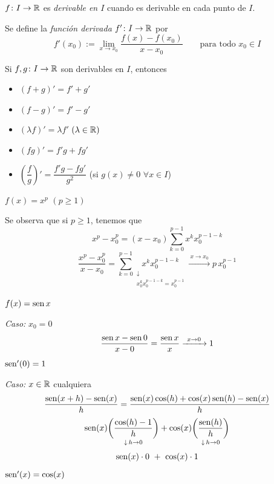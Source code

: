 \documentclass[11pt,a4paper]{article}
\newcommand{\abajo}[3][]{\underset{\substack{\downarrow\,#1\\ #3}}{#2}}
\begin{document}
\begin{definicion}
  $f\colon I\to\mathbb{R}$ es \emph{derivable en $I$} cuando es derivable en cada
  punto de $I$.

  Se define la \emph{función derivada} $f'\colon I\to\mathbb{R}$ por
  \[
    f'(x_0):=\lim_{x\to x_0}\frac{f(x)-f(x_0)}{x-x_0}
    \qquad\text{para todo } x_0\in I
  \]
\end{definicion}

\begin{proposicion}
  Si $f,g\colon I\to\mathbb{R}$ son derivables en $I$, entonces
  \begin{itemize}
    \item $(f+g)'=f'+g'$
    \item $(f-g)'=f'-g'$
    \item $(\lambda f)'=\lambda f'$ \quad $(\lambda\in\mathbb{R})$
    \item $(fg)'=f'g+fg'$
    \item $\left(\dfrac{f}{g}\right)'=\dfrac{f'g-fg'}{g^2}$
      \quad (si $g(x)\neq 0$ $\forall x\in I$)
  \end{itemize}
\end{proposicion}

\begin{ejemplo}
  $f(x)=x^p$ \quad $(p\geq 1)$

  Se observa que si $p\geq 1$, tenemos que
  \[
    x^p-x_0^p=(x-x_0)\sum_{k=0}^{p-1}x^k x_0^{p-1-k}
  \]
  \[
    \frac{x^p-x_0^p}{x-x_0}
    =\sum_{k=0}^{p-1}\abajo{x^k x_0^{p-1-k}}{x_0^k x_0^{p-1-k}
      =x_0^{p-1}}
    \xrightarrow{\ x\to x_0\ } p\,x_0^{p-1}
  \]

\end{ejemplo}

\begin{ejemplo}
  $f(x)=\operatorname{sen} x$

  \textit{Caso:} $x_0=0$
  \[
    \frac{\operatorname{sen} x-\operatorname{sen} 0}{x-0}=\frac{\operatorname{sen} x}{x}\xrightarrow{\ x\to 0\ }1
  \]
  $\operatorname{sen}'(0)=1$

  \textit{Caso:} $x\in\mathbb{R}$ cualquiera
  \[
    \frac{\operatorname{sen}(x+h)-\operatorname{sen}(x)}{h}
    =\frac{\operatorname{sen}(x)\cos(h)+\cos(x)\operatorname{sen}(h)-\operatorname{sen}(x)}{h}
  \]
  \[
    \sen(x)\abajo[h\to 0]{\left(\frac{\cos(h)-1}{h}\right)}{}
    +\cos(x)\abajo[h\to 0]{\left(\frac{\sen(h)}{h}\right)}{}
  \]
  \[
    \operatorname{sen}(x)\cdot 0\ +\ \cos(x)\cdot 1
  \]
  $\operatorname{sen}'(x)=\cos(x)$
\end{ejemplo}
\end{document}
